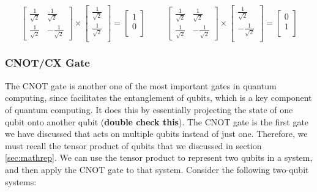 \documentclass{article}
\begin{document}
\begin{center}
	\[
		\begin{bmatrix}
			\frac{1}{\sqrt{2}} & \frac{1}{\sqrt{2}} \\
			\frac{1}{\sqrt{2}} & -\frac{1}{\sqrt{2}}
		\end{bmatrix}
		\times
		\begin{bmatrix}
			\frac{1}{\sqrt{2}} \\
			\frac{1}{\sqrt{2}} \\
		\end{bmatrix}
		=
		\begin{bmatrix}
			1 \\
			0 \\
		\end{bmatrix}
		\hspace{1cm}
		\begin{bmatrix}
			\frac{1}{\sqrt{2}} & \frac{1}{\sqrt{2}} \\
			\frac{1}{\sqrt{2}} & -\frac{1}{\sqrt{2}}
		\end{bmatrix}
		\times
		\begin{bmatrix}
			\frac{1}{\sqrt{2}} \\
			-\frac{1}{\sqrt{2}} \\
		\end{bmatrix}
		=
		\begin{bmatrix}
			0 \\
			1 \\
		\end{bmatrix}
	\]
\end{center}

\subsubsection{CNOT/CX Gate}
\label{sec:cnotgate}

The CNOT gate is another one of the most important gates in quantum computing, since facilitates the entanglement of qubits, which is a key component of quantum computing. It does
this by essentially projecting the state of one qubit onto another qubit (\textbf{double check this}). The CNOT gate is the first gate we have discussed that acts on multiple
qubits instead of just one. Therefore, we must recall the tensor product of qubits that we discussed in section \ref{sec:mathrep}. We can use the tensor product to represent 
two qubits in a system, and then apply the CNOT gate to that system. Consider the following two-qubit systems:
\end{document}
